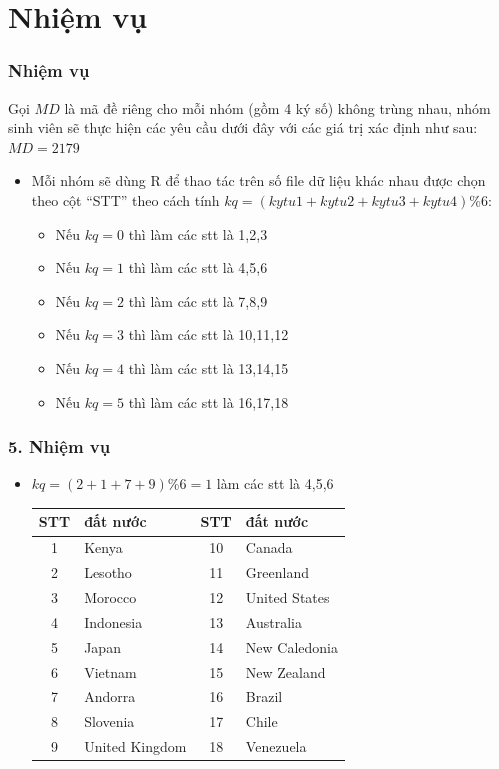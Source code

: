 \documentclass[english,10pt,table]{beamer}
\begin{document}
\section{Nhiệm vụ}
\begin{frame}
\frametitle{Nhiệm vụ}
Gọi $MD$ là mã đề riêng cho mỗi nhóm (gồm 4 ký số) không trùng nhau, nhóm sinh viên sẽ thực hiện các yêu cầu dưới đây với các giá trị xác định như sau:
$MD = 2179$
\begin{itemize}
	\item  Mỗi nhóm sẽ dùng R để thao tác trên số file dữ liệu khác nhau được chọn theo cột ``STT'' theo cách tính $kq = (kytu1  +  kytu2 +  kytu3 +  kytu4) \% 6$:
	\begin{itemize}
		\item Nếu $kq = 0$ thì làm các stt là {1,2,3}
		\item Nếu $kq = 1$ thì làm các stt là {4,5,6}
		\item Nếu $kq = 2$ thì làm các stt là {7,8,9}
		\item Nếu $kq = 3$ thì làm các stt là {10,11,12} 
		\item Nếu $kq = 4$ thì làm các stt là {13,14,15}
		\item Nếu $kq = 5$ thì làm các stt là {16,17,18}
	\end{itemize}
	\end{itemize}
\end{frame}

\begin{frame}
\frametitle{5. Nhiệm vụ}
\begin{itemize}
\item $kq = (2 + 1 + 7 + 9) \% 6 = 1$ làm các stt là {4,5,6}
	
	\begin{center}
		\begin{tabular}{ c | l | c | l}
			
			STT & đất nước & STT & đất nước\\ \hline
			1 & Kenya & 10 & Canada\\ 
			2 & Lesotho &  11 & Greenland\\ 
			3 & Morocco &  12 & United States\\ 
			4 & Indonesia & 13 & Australia \\ 
			5 & Japan  & 14 & New Caledonia\\
			6 & Vietnam  & 15 & New Zealand\\ 
			7 & Andorra  & 16 & Brazil\\ 
			8 & Slovenia  & 17 & Chile\\ 
			9 & United Kingdom & 18 & Venezuela \\
			
			\hline
		\end{tabular}
	\end{center}
\end{itemize}
\end{frame}
\end{document}
